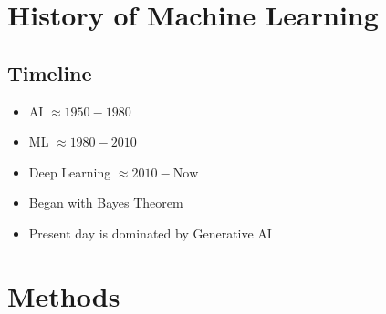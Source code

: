 \documentclass[12pt]{article}
\begin{document}
    \section{History of Machine Learning}
        \subsection{Timeline}
            \begin{itemize}
                \item AI $\approx 1950-1980$
                \item ML $\approx 1980-2010$
                \item Deep Learning $\approx 2010-\text{Now}$
                \item Began with Bayes Theorem
                \item Present day is dominated by Generative AI
            \end{itemize}
    \section{Methods}
\end{document}
